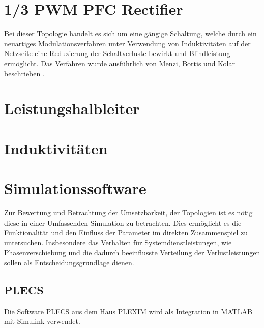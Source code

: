 \section{1/3 PWM PFC Rectifier}
Bei dieser Topologie handelt es sich um eine gängige Schaltung, welche durch ein neuartiges Modulationsverfahren unter Verwendung von Induktivitäten auf der Netzseite eine Reduzierung der Schaltverluste bewirkt und Blindleistung ermöglicht. Das Verfahren wurde ausführlich von Menzi, Bortis und Kolar beschrieben \cite{13PWMPFC}.



\section{Leistungshalbleiter}

\section{Induktivitäten}

\section{Simulationssoftware}
Zur Bewertung und Betrachtung der Umsetzbarkeit, der Topologien ist es nötig diese in einer Umfassenden Simulation zu betrachten. Dies ermöglicht es die Funktionalität und den Einfluss der Parameter im direkten Zusammenspiel zu untersuchen. Insbesondere das Verhalten für Systemdienstleistungen, wie Phasenverschiebung und die dadurch beeinflusste Verteilung der Verlustleistungen sollen als Entscheidungsgrundlage dienen. 

	\subsection{PLECS}
	Die Software \gls{PLECS} aus dem Haus PLEXIM wird als Integration in MATLAB mit Simulink verwendet.  